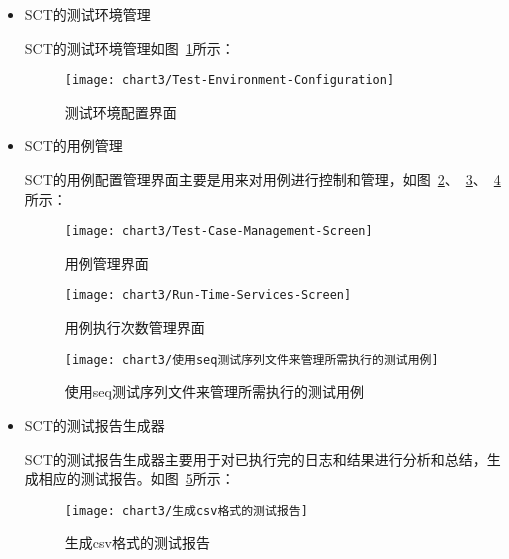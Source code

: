 \begin{itemize}
	\item SCT的测试环境管理
		
		SCT的测试环境管理如图~\ref{fig:Test-Environment-Configuration}所示：	
		
		\begin{figure}[htbp] %
			\centering
			\texttt{[image: chart3/Test-Environment-Configuration]}
			\caption{测试环境配置界面}
			\label{fig:Test-Environment-Configuration}
		\end{figure}
		
	\item SCT的用例管理
	
		SCT的用例配置管理界面主要是用来对用例进行控制和管理，如图~\ref{fig:Test-Case-Management-Screen}、~\ref{fig:Run-Time-Services-Screen}、~\ref{fig:使用seq测试序列文件来管理所需执行的测试用例}所示：
		
		\begin{figure}[H] %
			\centering
			\texttt{[image: chart3/Test-Case-Management-Screen]}
			\caption{用例管理界面}
			\label{fig:Test-Case-Management-Screen}
		\end{figure}
		
		\begin{figure}[H] %
			\centering
			\texttt{[image: chart3/Run-Time-Services-Screen]}
			\caption{用例执行次数管理界面}
			\label{fig:Run-Time-Services-Screen}
		\end{figure}
		
		\begin{figure}[H] %
			\centering
			\texttt{[image: chart3/使用seq测试序列文件来管理所需执行的测试用例]}
			\caption{使用seq测试序列文件来管理所需执行的测试用例}
			\label{fig:使用seq测试序列文件来管理所需执行的测试用例}
		\end{figure}
	
	\item SCT的测试报告生成器
	
		SCT的测试报告生成器主要用于对已执行完的日志和结果进行分析和总结，生成相应的测试报告。如图~\ref{fig:生成csv格式的测试报告}所示：
	
		\begin{figure}[H] %
			\centering
			\texttt{[image: chart3/生成csv格式的测试报告]}
			\caption{生成csv格式的测试报告}
			\label{fig:生成csv格式的测试报告}
		\end{figure}
		
\end{itemize}	
		
